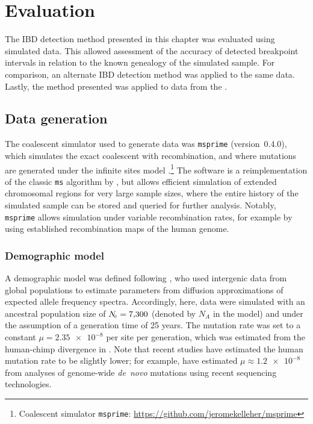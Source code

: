 %
\section{Evaluation}
%

The IBD detection method presented in this chapter was evaluated using simulated data.
This allowed assessment of the accuracy of detected breakpoint intervals in relation to the known genealogy of the simulated sample.
For comparison, an alternate IBD detection method was applied to the same data.
Lastly, the method presented was applied to data from the .



%
\subsection{Data generation}
\label{sec:msprime}
%

The coalescent simulator used to generate data was \texttt{msprime} (version~{0.4.0}), which simulates the exact coalescent with recombination, and where mutations are generated under the infinite sites model \citep{Kelleher:2016fn}.\footnote{Coalescent simulator \texttt{msprime}: \url{https://github.com/jeromekelleher/msprime} }
The software is a reimplementation of the classic \texttt{ms} algorithm by \citet{Hudson:2002vy}, but allows efficient simulation of extended chromosomal regions for very large sample sizes, where the entire history of the simulated sample can be stored and queried for further analysis.
Notably, \texttt{msprime} allows simulation under variable recombination rates, for example by using established recombination maps of the human genome.


%
\subsubsection{Demographic model}
\label{sec:sim_demo_model}
%

A demographic model was defined following \citet{Gutenkunst:2009gs}, who used intergenic data from  global populations to estimate parameters from diffusion approximations of expected allele frequency spectra.
Accordingly, here, data were simulated with an ancestral population size of ${N_{\!e} = \num{7300}}$ (denoted by $N_A$ in the model) and under the assumption of a generation time of 25 years.
The mutation rate was set to a constant ${\mu = \num[round-precision=2]{2.35e-8}}$ per site per generation, which was estimated from the human-chimp divergence in \citet{Gutenkunst:2009gs}.
Note that recent studies have estimated the human mutation rate to be slightly lower; for example, \citet{Scally:2012fe} have estimated ${\mu \approx \num[round-precision=1]{1.2e-8}}$ from analyses of genome-wide \emph{de~novo} mutations using recent sequencing technologies.

